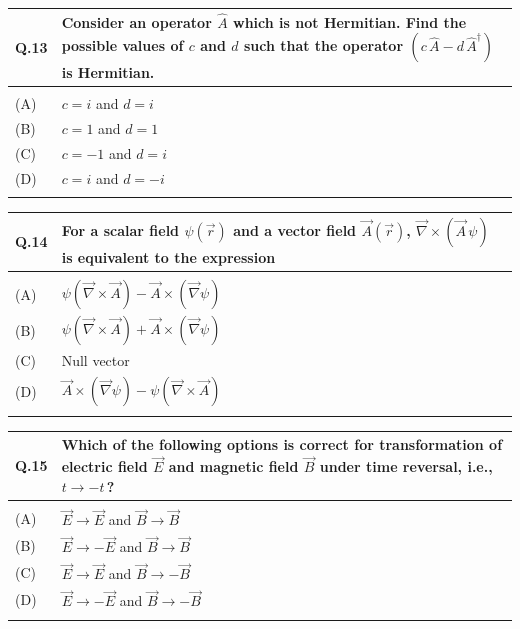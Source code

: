 \documentclass[12pt,a4paper]{article}
\begin{document}
\newpage

\begin{tabular}{|p{1cm}|p{12cm}|}
\hline
Q.13 & Consider an operator $\hat{A}$ which is not Hermitian. Find the possible values of $c$ and $d$ such
that the operator $(c\,\hat{A} - d\,\hat{A}^\dagger)$ is Hermitian. \\
\hline
& \rule{0pt}{0.8cm} \\
\hline
(A) & $c = i$ and $d = i$ \\
\hline
(B) & $c = 1$ and $d = 1$ \\
\hline
(C) & $c = -1$ and $d = i$ \\
\hline
(D) & $c = i$ and $d = -i$ \\
\hline
& \rule{0pt}{0.8cm} \\
\hline
\end{tabular}

\newpage

\begin{tabular}{|p{1cm}|p{12cm}|}
\hline
Q.14 & For a scalar field $\psi(\vec{r})$ and a vector field $\vec{A}(\vec{r})$,
$\vec{\nabla} \times (\vec{A}\,\psi)$ is equivalent to the expression \\
\hline
& \rule{0pt}{0.8cm} \\
\hline
(A) & $\psi(\vec{\nabla} \times \vec{A}) - \vec{A} \times (\vec{\nabla}\psi)$ \\
\hline
(B) & $\psi(\vec{\nabla} \times \vec{A}) + \vec{A} \times (\vec{\nabla}\psi)$ \\
\hline
(C) & Null vector \\
\hline
(D) & $\vec{A} \times (\vec{\nabla}\psi) - \psi(\vec{\nabla} \times \vec{A})$ \\
\hline
& \rule{0pt}{0.8cm} \\
\hline
\end{tabular}

\vspace{1em}

\begin{tabular}{|p{1cm}|p{12cm}|}
\hline
Q.15 & Which of the following options is correct for transformation of electric field $\vec{E}$ and
magnetic field $\vec{B}$ under time reversal, i.e., $t \to -t$\,? \\
\hline
& \rule{0pt}{0.8cm} \\
\hline
(A) & $\vec{E} \to \vec{E}$ and $\vec{B} \to \vec{B}$ \\
\hline
(B) & $\vec{E} \to -\vec{E}$ and $\vec{B} \to \vec{B}$ \\
\hline
(C) & $\vec{E} \to \vec{E}$ and $\vec{B} \to -\vec{B}$ \\
\hline
(D) & $\vec{E} \to -\vec{E}$ and $\vec{B} \to -\vec{B}$ \\
\hline
& \rule{0pt}{0.8cm} \\
\hline
\end{tabular}
\end{document}
